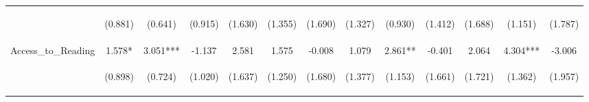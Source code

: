\begin{tabular}{lcccccccccccc}
 & \begin{footnotesize}(0.881)\end{footnotesize} & \begin{footnotesize}(0.641)\end{footnotesize} & \begin{footnotesize}(0.915)\end{footnotesize} & \begin{footnotesize}(1.630)\end{footnotesize} & \begin{footnotesize}(1.355)\end{footnotesize} & \begin{footnotesize}(1.690)\end{footnotesize} & \begin{footnotesize}(1.327)\end{footnotesize} & \begin{footnotesize}(0.930)\end{footnotesize} & \begin{footnotesize}(1.412)\end{footnotesize} & \begin{footnotesize}(1.688)\end{footnotesize} & \begin{footnotesize}(1.151)\end{footnotesize} & \begin{footnotesize}(1.787)\end{footnotesize}\\
\noalign{\smallskip}Access_to_Reading & 1.578* & 3.051*** & -1.137 & 2.581 & 1.575 & -0.008 & 1.079 & 2.861** & -0.401 & 2.064 & 4.304*** & -3.006\\
 & \begin{footnotesize}(0.898)\end{footnotesize} & \begin{footnotesize}(0.724)\end{footnotesize} & \begin{footnotesize}(1.020)\end{footnotesize} & \begin{footnotesize}(1.637)\end{footnotesize} & \begin{footnotesize}(1.250)\end{footnotesize} & \begin{footnotesize}(1.680)\end{footnotesize} & \begin{footnotesize}(1.377)\end{footnotesize} & \begin{footnotesize}(1.153)\end{footnotesize} & \begin{footnotesize}(1.661)\end{footnotesize} & \begin{footnotesize}(1.721)\end{footnotesize} & \begin{footnotesize}(1.362)\end{footnotesize} & \begin{footnotesize}(1.957)\end{footnotesize}\\

\end{tabular}
